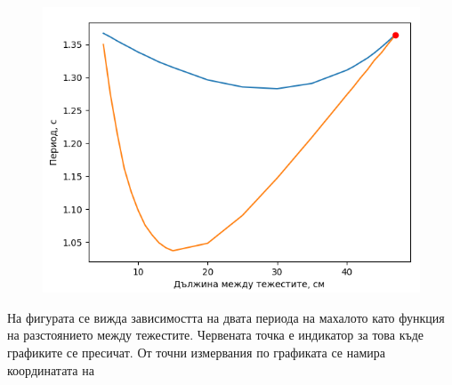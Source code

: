 \documentclass[aps, prb, twocolumn, a4paper, floatfix, reprint]{revtex4-2}
\begin{document}
\begin{figure}[H]
    \includegraphics[width=0.9\columnwidth, keepaspectratio=true]{fig_1.png}
\end{figure}

На фигурата се вижда зависимостта на двата периода на махалото като функция на разстоянието между тежестите. Червената точка е индикатор за това къде графиките се пресичат. От точни измервания по графиката се намира координатата на  
\end{document}
